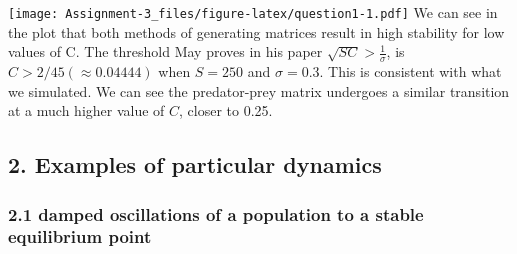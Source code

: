 \documentclass[
]{article}
\begin{document}
\texttt{[image: Assignment-3\_files/figure-latex/question1-1.pdf]} We can
see in the plot that both methods of generating matrices result in high
stability for low values of C. The threshold May proves in his paper
\(\sqrt{SC}>\frac{1}{\sigma}\), is \(C>2/45(\approx0.04444)\) when
\(S=250\) and \(\sigma=0.3\). This is consistent with what we simulated.
We can see the predator-prey matrix undergoes a similar transition at a
much higher value of \(C\), closer to 0.25.

\hypertarget{examples-of-particular-dynamics}{%
\subsection{2. Examples of particular
dynamics}\label{examples-of-particular-dynamics}}

\hypertarget{damped-oscillations-of-a-population-to-a-stable-equilibrium-point}{%
\subsubsection{2.1 damped oscillations of a population to a stable
equilibrium
point}\label{damped-oscillations-of-a-population-to-a-stable-equilibrium-point}}
\end{document}
